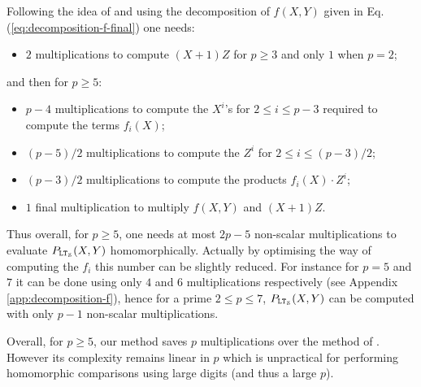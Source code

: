Following the idea of \cite{TLWRK20} and using the decomposition of $f(X,Y)$ given in Eq. (\ref{eq:decomposition-f-final}) one needs:
\begin{itemize}
\item $2$ multiplications to compute $(X+1)Z$ for $p\geq 3$ and only $1$ when $p=2$;
\end{itemize}
and then for $p\geq 5$:
\begin{itemize}
\item $p-4$ multiplications to compute the $X^i$'s for $2\leq i \leq p-3$ required to compute the terms $f_i(X)$;
\item $(p-5)/2$ multiplications to compute the $Z^i$ for $2\leq i \leq (p-3)/2$;
\item $(p-3)/2$ multiplications to compute the products $f_i(X)\cdot Z^i$;
\item $1$ final multiplication to multiply $f(X,Y)$ and $(X+1)Z$.
\end{itemize}

Thus overall, for $p\geq 5$, one needs at most $2p-5$ non-scalar multiplications to evaluate $P_{\mathtt{LT}_{\mathcal{S}}}(X,Y)$ homomorphically. 
Actually by optimising the way of computing the $f_i$ this number can be slightly reduced. 
For instance for $p=5$ and $7$ it can be done using only $4$ and $6$ multiplications respectively (see Appendix \ref{app:decomposition-f}), hence for a prime $2\leq p \leq 7$, $P_{\mathtt{LT}_{\mathcal{S}}}(X,Y)$ can be computed with only $p-1$ non-scalar multiplications.

Overall, for $p\geq 5$, our method saves $p$ multiplications over the method of \cite{TLWRK20}. However its complexity remains linear in $p$ which is unpractical for performing homomorphic comparisons using large digits (and thus a large $p$).
  
